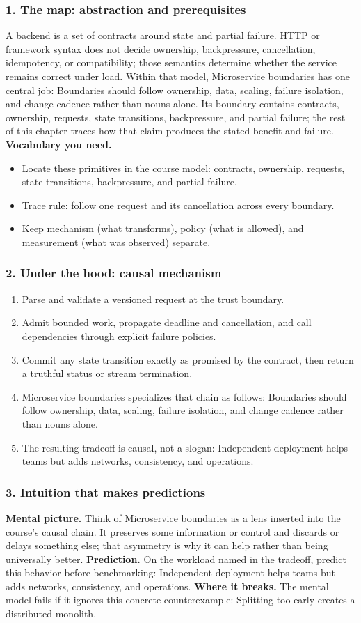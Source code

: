 \subsubsection*{1. The map: abstraction and prerequisites}
A backend is a set of contracts around state and partial failure. HTTP or framework syntax does not decide ownership, backpressure, cancellation, idempotency, or compatibility; those semantics determine whether the service remains correct under load.
Within that model, Microservice boundaries has one central job: Boundaries should follow ownership, data, scaling, failure isolation, and change cadence rather than nouns alone. Its boundary contains contracts, ownership, requests, state transitions, backpressure, and partial failure; the rest of this chapter traces how that claim produces the stated benefit and failure.
\textbf{Vocabulary you need.}\begin{itemize}
\item Locate these primitives in the course model: contracts, ownership, requests, state transitions, backpressure, and partial failure.
\item Trace rule: follow one request and its cancellation across every boundary.
\item Keep mechanism (what transforms), policy (what is allowed), and measurement (what was observed) separate.
\end{itemize}
\subsubsection*{2. Under the hood: causal mechanism}\begin{enumerate}
\item Parse and validate a versioned request at the trust boundary.
\item Admit bounded work, propagate deadline and cancellation, and call dependencies through explicit failure policies.
\item Commit any state transition exactly as promised by the contract, then return a truthful status or stream termination.
\item Microservice boundaries specializes that chain as follows: Boundaries should follow ownership, data, scaling, failure isolation, and change cadence rather than nouns alone.
\item The resulting tradeoff is causal, not a slogan: Independent deployment helps teams but adds networks, consistency, and operations.
\end{enumerate}
\subsubsection*{3. Intuition that makes predictions}
\textbf{Mental picture.} Think of Microservice boundaries as a lens inserted into the course's causal chain. It preserves some information or control and discards or delays something else; that asymmetry is why it can help rather than being universally better.
\textbf{Prediction.} On the workload named in the tradeoff, predict this behavior before benchmarking: Independent deployment helps teams but adds networks, consistency, and operations.
\textbf{Where it breaks.} The mental model fails if it ignores this concrete counterexample: Splitting too early creates a distributed monolith.
